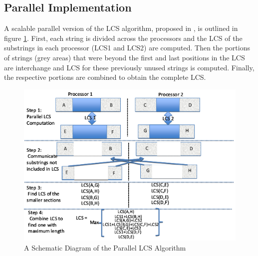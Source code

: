 \documentclass[journal,twoside]{IEEEtran}
\begin{document}
\subsection{Parallel Implementation}
A scalable parallel version of the LCS algorithm, proposed in \cite{bastola}, is outlined in figure \ref{fig:parallel}. First, each string is divided across the processors and the LCS of the substrings in each processor (LCS1 and LCS2) are computed. Then the portions of strings (grey areas) that were beyond the first and last positions in the LCS are interchange and LCS for these previously unused strings is computed. Finally, the respective portions are combined to obtain the complete LCS.\\

\begin{figure}[h]
\centering
\includegraphics[scale=0.35]{parallel}
\caption{A Schematic Diagram of the Parallel LCS Algorithm}
\label{fig:parallel}
\end{figure}


%
%
\end{document}
